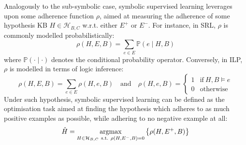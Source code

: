 \documentclass[12pt,a4paper,openright,twoside]{book}
\begin{document}
Analogously to the sub-symbolic case, symbolic supervised learning leverages upon some adherence function $\rho$, aimed at measuring the adherence of some hypothesis KB $H \in \mathcal{H}_{B,C}$ w.r.t. either $E^+$ or $E^-$.
%
For instance, in SRL, $\rho$ is commonly modelled probabilistically:
%
\begin{equation*}
    \rho(H, E, B) = \sum_{e \in E} \mathbb{P}(e \mid H, B)
\end{equation*}
%
where $\mathbb{P}(\cdot \mid \cdot)$ denotes the conditional probability operator.
%
Conversely, in ILP, $\rho$ is modelled in terms of logic inference\footnotemark:
%
\begin{equation*}
    \rho(H, E, B) = \sum_{e \in E} \rho(H, e, B)
    \quad \text{and} \quad
    \rho(H, e, B) = \begin{cases}
        1 & \text{if} ~ H, B \models e
        \\
        0 & \text{otherwise}
    \end{cases}
\end{equation*}
%
%
Under such hypothesis, symbolic supervised learning can be defined as \cite{DeRaedt2010} the optimisation task aimed at finding the hypothesis which adheres to as much positive examples as possible, while adhering to no negative example at all:
%
\begin{equation}
    \hat{H} = \underset{H \in \mathcal{H}_{B,C} ~ \text{s.t.} ~ \rho(H, E^-, B) = 0}{\text{argmax}} \left\{ \rho(H, E^+, B) \right\}
\end{equation}
\end{document}
